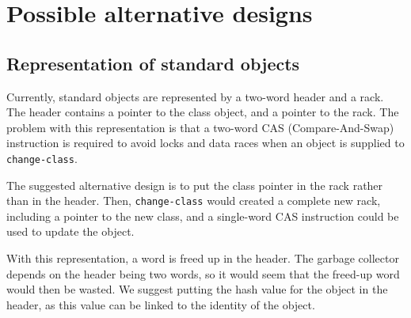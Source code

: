 \chapter{Possible alternative designs}

\section{Representation of standard objects}
\label{sec-alternative-representation-of-standard-objects}

Currently, standard objects are represented by a two-word header and a
rack.  The header contains a pointer to the class object, and a
pointer to the rack.  The problem with this representation is that a
two-word CAS (Compare-And-Swap) instruction is required to avoid locks
and data races when an object is supplied to \texttt{change-class}.

The suggested alternative design is to put the class pointer in the
rack rather than in the header.  Then, \texttt{change-class} would
created a complete new rack, including a pointer to the new class, and
a single-word CAS instruction could be used to update the object.

With this representation, a word is freed up in the header.  The
garbage collector depends on the header being two words, so it would
seem that the freed-up word would then be wasted.  We suggest putting
the hash value for the object in the header, as this value can be
linked to the identity of the object.
